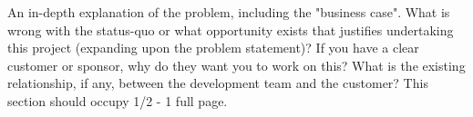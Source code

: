 An in-depth explanation of the problem, including the "business case". What is wrong with the status-quo or what opportunity exists that justifies undertaking this project (expanding upon the problem statement)? If you have a clear customer or sponsor, why do they want you to work on this? What is the existing relationship, if any, between the development team and the customer? This section should occupy 1/2 - 1 full page.